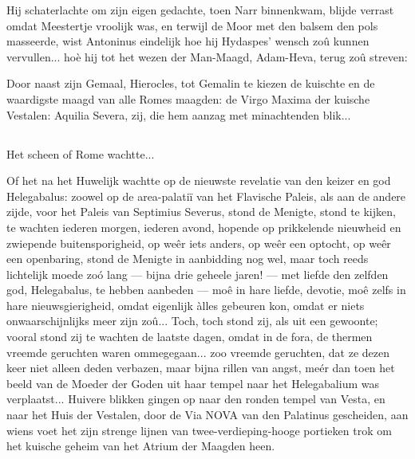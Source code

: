 \documentclass[a4paper, 12pt, oneside, dutch]{article}
\begin{document}
Hij schaterlachte om zijn eigen gedachte, toen Narr binnenkwam, blijde verrast omdat Meestertje vroolijk was, en terwijl de Moor met den balsem den pols masseerde, wist Antoninus eindelijk hoe hij Hydaspes' wensch zoû kunnen vervullen... hoè hij tot het wezen der Man-Maagd, Adam-Heva, terug zoû streven:

Door naast zijn Gemaal, Hierocles, tot Gemalin te kiezen de kuischte en de waardigste maagd van alle Romes maagden: de Virgo Maxima der kuische Vestalen: Aquilia Severa, zij, die hem aanzag met minachtenden blik...

\subsection{}
\paragraph{}
Het scheen of Rome wachtte...

Of het na het Huwelijk wachtte op de nieuwste revelatie van den keizer en god Helegabalus: zoowel op de area-palatiï van het Flavische Paleis, als aan de andere zijde, voor het Paleis van Septimius Severus, stond de Menigte, stond te kijken, te wachten iederen morgen, iederen avond, hopende op prikkelende nieuwheid en zwiepende buitensporigheid, op weêr iets anders, op weêr een optocht, op weêr een openbaring, stond de Menigte in aanbidding nog wel, maar toch reeds lichtelijk moede zoó lang --- bijna drie geheele jaren! --- met liefde den zelfden god, Helegabalus, te hebben aanbeden --- moê in hare liefde, devotie, moê zelfs in hare nieuwsgierigheid, omdat eigenlijk àlles gebeuren kon, omdat er niets onwaarschijnlijks meer zijn zoû... Toch, toch stond zij, als uit een gewoonte; vooral stond zij te wachten de laatste dagen, omdat in de fora, de thermen vreemde geruchten waren ommegegaan... zoo vreemde geruchten, dat ze dezen keer niet alleen deden verbazen, maar bijna rillen van angst, meér dan toen het beeld van de Moeder der Goden uit haar tempel naar het Helegabalium was verplaatst... Huivere blikken gingen op naar den ronden tempel van Vesta, en naar het Huis der Vestalen, door de Via NOVA van den Palatinus gescheiden, aan wiens voet het zijn strenge lijnen van twee-verdieping-hooge portieken trok om het kuische geheim van het Atrium der Maagden heen.
\end{document}

